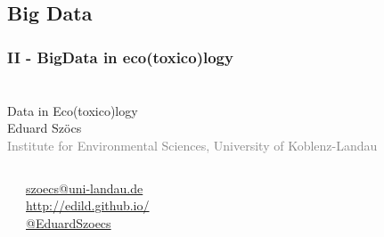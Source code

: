 \documentclass[12pt, t]{beamer}
\begin{document}
\subsection{Big Data}
\begin{frame}
\frametitle{II - BigData in eco(toxico)logy}
\begin{adjustbox}{max totalsize={.9\textwidth}{.8\textheight},center}
\end{adjustbox}	
\end{frame}




\section{}
\begin{frame}
\frametitle{}
\vspace{1em}
\center
\Large \textcolor{title}{Data in Eco(toxico)logy} \\[1em]
Eduard Szöcs \\[0.3em]
\tiny \textcolor{gray}{Institute for Environmental Sciences, University of Koblenz-Landau} \\[5em]
\begin{columns}
\begin{column}{0.6\textwidth}
\normalsize
\faEnvelope~~~\href{mailto:szoecs@uni-landau.de}{szoecs@uni-landau.de} \\[.5em]
\faLaptop~~~\href{http://edild.github.io/}{http://edild.github.io/ }\\[.5em]
\faTwitter~~~\href{http://twitter.com/EduardSzoecs}{@EduardSzoecs}
\end{column}
\begin{column}{0.38\textwidth}
\end{column}
\end{columns}

\end{frame}
\end{document}
